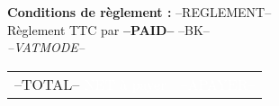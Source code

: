 \begin{minipage}[t]{0.49\textwidth}
\begin{fminipage}
{\footnotesize \textbf{Conditions de règlement :} --REGLEMENT--}\\
{\footnotesize Règlement TTC par \textbf{--PAID--} --BK--}\\
{\it \footnotesize --VATMODE--}
\end{fminipage}
\end{minipage}
\hspace{.1cm}
\begin{minipage}[t]{0.50\textwidth}
\begin{flushright}
\begin{tabular}{p{4.5cm} r}
--TOTAL--
\rowcolor{violet}\textcolor{white}{NET à payer} &\textcolor{white}{--APAYER--} \\ 
\end{tabular} 
\end{flushright}
\end{minipage}

